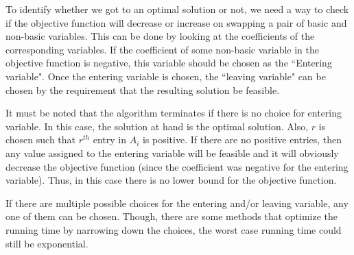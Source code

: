 To identify whether we got to an optimal solution or not, we need a way to check if the objective function will decrease or increase on swapping a pair of basic and non-basic variables. This can be done by looking at the coefficients of the corresponding variables. If the coefficient of some non-basic variable in the objective function is negative, this variable should be chosen as the ``Entering variable". Once the entering variable is chosen, the ``leaving variable" can be chosen by the requirement that the resulting solution be feasible.

It must be noted that the algorithm terminates if there is no choice for entering variable. In this case, the solution at hand is the optimal solution. Also, $r$ is chosen such that $r^{th}$ entry in $A_i$ is positive. If there are no positive entries, then any value assigned to the entering variable will be feasible and it will obviously decrease the objective function (since the coefficient was negative for the entering variable). Thus, in this case there is no lower bound for the objective function. 

If there are multiple possible choices for the entering and/or leaving variable, any one of them can be chosen. Though, there are some methods that optimize the running time by narrowing down the choices, the worst case running time could still be exponential.
